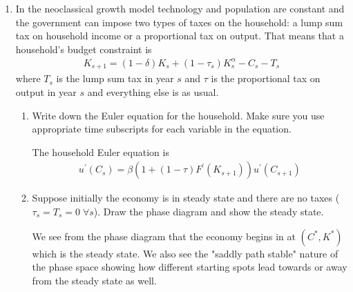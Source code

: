 \documentclass[11pt]{SelfArxOneColBMN}
\begin{document}
\begin{enumerate}
  \item In the neoclassical growth model technology and population are constant and the government can impose two types of taxes on the household: a lump sum tax on household income or a proportional tax on output. That means that a household's budget constraint is
  \begin{eqnarray*}
    K_{s + 1} = (1 - \delta)K_s + (1 - \tau_s)K_s^\alpha - C_s - T_s
  \end{eqnarray*}
  where $T_s$ is the lump sum tax in year $s$ and $\tau$ is the proportional tax on output in year $s$ and everything else is as usual.
  \begin{enumerate}
    \item Write down the Euler equation for the household. Make sure you use appropriate time subscripts for each variable in the equation.
    \begin{solution}
      The household Euler equation is
      \begin{eqnarray*}
        u^\prime(C_s) = \beta(1 + (1 - \tau)F^\prime(K_{s+1}))u^\prime(C_{s+1})
      \end{eqnarray*}
    \end{solution}
    \item Suppose initially the economy is in steady state and there are no taxes ($\tau_s = T_s = 0 \; \forall s$). Draw the phase diagram and show the steady state.
    \begin{solution}
      We see from the phase diagram that the economy begins in at $(C^*,K^*)$ which is the steady state. We also see the "saddly path stable" nature of the phase space showing how different starting spots lead towards or away from the steady state as well.\\

\end{solution}
\end{enumerate}
\end{enumerate}
\end{document}
